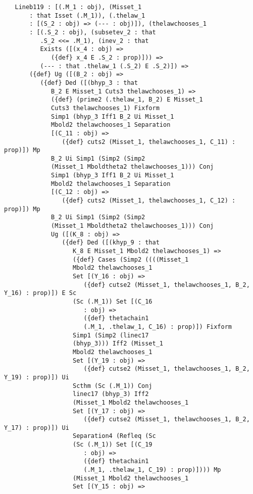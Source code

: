 \documentclass[12pt]{article}
\begin{document}
\begin{verbatim}
   Lineb119 : [(.M_1 : obj), (Misset_1 
       : that Isset (.M_1)), (.thelaw_1 
       : [(S_2 : obj) => (--- : obj)]), (thelawchooses_1 
       : [(.S_2 : obj), (subsetev_2 : that 
          .S_2 <<= .M_1), (inev_2 : that 
          Exists ([(x_4 : obj) => 
             ({def} x_4 E .S_2 : prop)])) => 
          (--- : that .thelaw_1 (.S_2) E .S_2)]) => 
       ({def} Ug ([(B_2 : obj) => 
          ({def} Ded ([(bhyp_3 : that 
             B_2 E Misset_1 Cuts3 thelawchooses_1) => 
             ({def} (prime2 (.thelaw_1, B_2) E Misset_1 
             Cuts3 thelawchooses_1) Fixform 
             Simp1 (bhyp_3 Iff1 B_2 Ui Misset_1 
             Mbold2 thelawchooses_1 Separation 
             [(C_11 : obj) => 
                ({def} cuts2 (Misset_1, thelawchooses_1, C_11) : prop)]) Mp 
             B_2 Ui Simp1 (Simp2 (Simp2 
             (Misset_1 Mboldtheta2 thelawchooses_1))) Conj 
             Simp1 (bhyp_3 Iff1 B_2 Ui Misset_1 
             Mbold2 thelawchooses_1 Separation 
             [(C_12 : obj) => 
                ({def} cuts2 (Misset_1, thelawchooses_1, C_12) : prop)]) Mp 
             B_2 Ui Simp1 (Simp2 (Simp2 
             (Misset_1 Mboldtheta2 thelawchooses_1))) Conj 
             Ug ([(K_8 : obj) => 
                ({def} Ded ([(khyp_9 : that 
                   K_8 E Misset_1 Mbold2 thelawchooses_1) => 
                   ({def} Cases (Simp2 ((((Misset_1 
                   Mbold2 thelawchooses_1 
                   Set [(Y_16 : obj) => 
                      ({def} cutse2 (Misset_1, thelawchooses_1, B_2, Y_16) : prop)]) E Sc 
                   (Sc (.M_1)) Set [(C_16 
                      : obj) => 
                      ({def} thetachain1 
                      (.M_1, .thelaw_1, C_16) : prop)]) Fixform 
                   Simp1 (Simp2 (linec17 
                   (bhyp_3))) Iff2 (Misset_1 
                   Mbold2 thelawchooses_1 
                   Set [(Y_19 : obj) => 
                      ({def} cutse2 (Misset_1, thelawchooses_1, B_2, Y_19) : prop)]) Ui 
                   Scthm (Sc (.M_1)) Conj 
                   linec17 (bhyp_3) Iff2 
                   (Misset_1 Mbold2 thelawchooses_1 
                   Set [(Y_17 : obj) => 
                      ({def} cutse2 (Misset_1, thelawchooses_1, B_2, Y_17) : prop)]) Ui 
                   Separation4 (Refleq (Sc 
                   (Sc (.M_1)) Set [(C_19 
                      : obj) => 
                      ({def} thetachain1 
                      (.M_1, .thelaw_1, C_19) : prop)]))) Mp 
                   (Misset_1 Mbold2 thelawchooses_1 
                   Set [(Y_15 : obj) => 

\end{verbatim}
\end{document}
